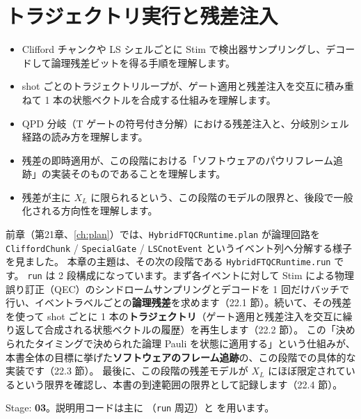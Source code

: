 \chapter{トラジェクトリ実行と残差注入}\label{ch:trajectory}

\begin{chaptergoal}
  \begin{itemize}
  \item Clifford チャンクや LS シェルごとに Stim で検出器サンプリングし、デコードして論理残差ビットを得る手順を理解します。
  \item shot ごとのトラジェクトリループが、ゲート適用と残差注入を交互に積み重ねて 1 本の状態ベクトルを合成する仕組みを理解します。
  \item QPD 分岐（T ゲートの符号付き分解）における残差注入と、分岐別シェル経路の読み方を理解します。
  \item 残差の即時適用が、この段階における「ソフトウェアのパウリフレーム追跡」の実装そのものであることを理解します。
  \item 残差が主に $X_L$ に限られるという、この段階のモデルの限界と、後段で一般化される方向性を理解します。
  \end{itemize}
\end{chaptergoal}

前章（第21章、\ref{ch:plan}）では、\texttt{HybridFTQCRuntime.plan} が論理回路を \texttt{CliffordChunk} / \texttt{SpecialGate} / \texttt{LSCnotEvent} というイベント列へ分解する様子を見ました。
本章の主題は、その次の段階である \texttt{HybridFTQCRuntime.run} です。
\texttt{run} は 2 段構成になっています。まず各イベントに対して Stim による物理誤り訂正（QEC）のシンドロームサンプリングとデコードを 1 回だけバッチで行い、イベントラベルごとの\textbf{論理残差}を求めます（22.1 節）。続いて、その残差を使って shot ごとに 1 本の\textbf{トラジェクトリ}（ゲート適用と残差注入を交互に繰り返して合成される状態ベクトルの履歴）を再生します（22.2 節）。
この「決められたタイミングで決められた論理 Pauli を状態に適用する」という仕組みが、本書全体の目標に挙げた\textbf{ソフトウェアのフレーム追跡}の、この段階での具体的な実装です（22.3 節）。
最後に、この段階の残差モデルが $X_L$ にほぼ限定されているという限界を確認し、本書の到達範囲の限界として記録します（22.4 節）。

\begin{notebox}
  Stage: \textbf{03}。説明用コードは主に （\texttt{run} 周辺）と  を用います。
\end{notebox}

